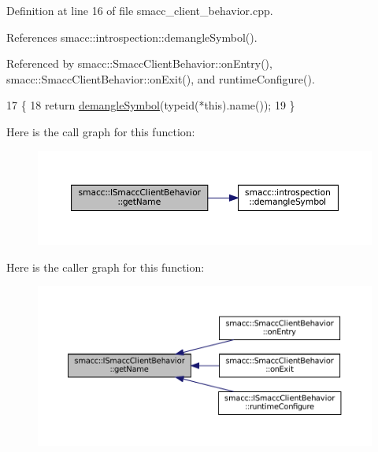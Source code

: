 Definition at line 16 of file smacc\+\_\+client\+\_\+behavior.\+cpp.



References smacc\+::introspection\+::demangle\+Symbol().



Referenced by smacc\+::\+Smacc\+Client\+Behavior\+::on\+Entry(), smacc\+::\+Smacc\+Client\+Behavior\+::on\+Exit(), and runtime\+Configure().


\begin{DoxyCode}
17     \{
18         \textcolor{keywordflow}{return} \hyperlink{namespacesmacc_1_1introspection_a2f495108db3e57604d8d3ff5ef030302}{demangleSymbol}(\textcolor{keyword}{typeid}(*this).name());
19     \}
\end{DoxyCode}
Here is the call graph for this function\+:
\nopagebreak
\begin{figure}[H]
\begin{center}
\leavevmode
\includegraphics[width=350pt]{classsmacc_1_1ISmaccClientBehavior_a18e4bec9460b010f2894c0f7e7064a34_cgraph}
\end{center}
\end{figure}
Here is the caller graph for this function\+:
\nopagebreak
\begin{figure}[H]
\begin{center}
\leavevmode
\includegraphics[width=350pt]{classsmacc_1_1ISmaccClientBehavior_a18e4bec9460b010f2894c0f7e7064a34_icgraph}
\end{center}
\end{figure}
\mbox{\label{classsmacc_1_1ISmaccClientBehavior_a9d55a85bf0a920033805a3c050de2019}} 
